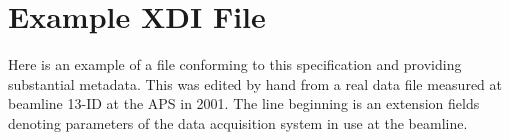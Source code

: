 \documentclass{article}
\begin{document}
\newpage
\appendix

\section{Example XDI File}
\label{apdx:example}

Here is an example of a file conforming to this specification and
providing substantial metadata.  This was edited by hand from a real
data file measured at beamline 13-ID at the APS in 2001.  The line
beginning  is an extension fields denoting
parameters of the data acquisition system in use at the beamline.

\begin{center}
\begin{Boxedminipage}[h]{0.7\linewidth}
\begin{alltt}

\end{alltt}
\end{Boxedminipage}
\end{center}
\end{document}
